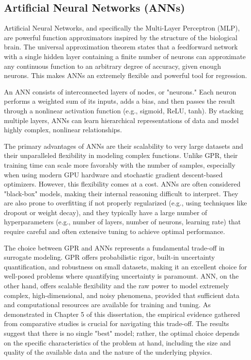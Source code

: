 \documentclass[dscexam, EN]{ufabcFHZh}
\begin{document}
\subsection{Artificial Neural Networks (ANNs)}

Artificial Neural Networks, and specifically the Multi-Layer Perceptron (MLP), are powerful function approximators inspired by the structure of the biological brain. The universal approximation theorem states that a feedforward network with a single hidden layer containing a finite number of neurons can approximate any continuous function to an arbitrary degree of accuracy, given enough neurons. This makes ANNs an extremely flexible and powerful tool for regression.

An ANN consists of interconnected layers of nodes, or "neurons." Each neuron performs a weighted sum of its inputs, adds a bias, and then passes the result through a nonlinear activation function (e.g., sigmoid, ReLU, tanh). By stacking multiple layers, ANNs can learn hierarchical representations of data and model highly complex, nonlinear relationships.

The primary advantages of ANNs are their scalability to very large datasets and their unparalleled flexibility in modeling complex functions. Unlike GPR, their training time can scale more favorably with the number of samples, especially when using modern GPU hardware and stochastic gradient descent-based optimizers. However, this flexibility comes at a cost. ANNs are often considered "black-box" models, making their internal reasoning difficult to interpret. They are also prone to overfitting if not properly regularized (e.g., using techniques like dropout or weight decay), and they typically have a large number of hyperparameters (e.g., number of layers, number of neurons, learning rate) that require careful and often extensive tuning to achieve optimal performance. 

The choice between GPR and ANNs represents a fundamental trade-off in surrogate modeling. GPR offers probabilistic rigor, built-in uncertainty quantification, and robustness on small datasets, making it an excellent choice for well-posed problems where quantifying uncertainty is paramount. ANN, on the other hand, offers scalable flexibility and the raw power to model extremely complex, high-dimensional, and noisy phenomena, provided that sufficient data and computational resources are available for training and tuning. As demonstrated in Chapter 5 of this dissertation, the empirical evidence gathered from comparative studies is crucial for navigating this trade-off. The results suggest that there is no single "best" model; rather, the optimal choice depends on the specific characteristics of the problem at hand, including the size and quality of the available data and the nature of the underlying physics.
\end{document}
